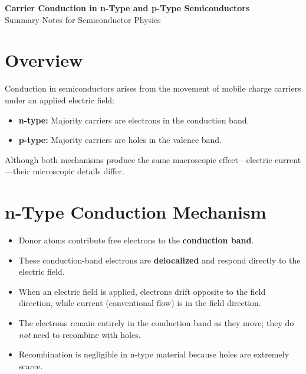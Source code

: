 \documentclass[12pt]{article}
\begin{document}
	
	\begin{center}
		{\LARGE \textbf{Carrier Conduction in n-Type and p-Type Semiconductors}}\\[0.5em]
		{\large Summary Notes for Semiconductor Physics}
	\end{center}
	\vspace{1em}
	
	\section{Overview}
	Conduction in semiconductors arises from the movement of mobile charge carriers under an applied electric field:
	\begin{itemize}
		\item \textbf{n-type:} Majority carriers are electrons in the conduction band.
		\item \textbf{p-type:} Majority carriers are holes in the valence band.
	\end{itemize}
	Although both mechanisms produce the same macroscopic effect---electric current---their microscopic details differ.
	
	\section{n-Type Conduction Mechanism}
	\begin{itemize}
		\item Donor atoms contribute free electrons to the \textbf{conduction band}.
		\item These conduction-band electrons are \textbf{delocalized} and respond directly to the electric field.
		\item When an electric field is applied, electrons drift opposite to the field direction, while current (conventional flow) is in the field direction.
		\item The electrons remain entirely in the conduction band as they move; they do \emph{not} need to recombine with holes.
		\item Recombination is negligible in n-type material because holes are extremely scarce.
	\end{itemize}
	
\end{document}
